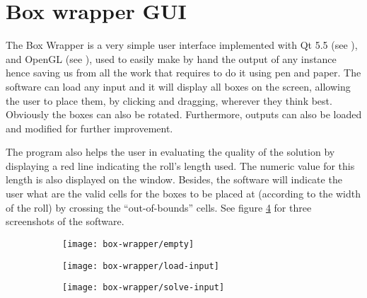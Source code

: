 \section{Box wrapper GUI}
\label{sec:box-wrapper-gui}

The Box Wrapper is a very simple user interface implemented with Qt 5.5
(see \cite{Qt5.5WEB}), and OpenGL (see \cite{OpenGLWEB}), used to easily
make by hand the output of any instance hence saving us from all the work
that requires to do it using pen and paper. The software can load any input
and it will display all boxes on the screen, allowing the user to place
them, by clicking and dragging, wherever they think best. Obviously the
boxes can also be rotated. Furthermore, outputs can also be loaded and
modified for further improvement.

\hfill

The program also helps the user in evaluating the quality of the solution
by displaying a red line indicating the roll's length used. The numeric
value for this length is also displayed on the window. Besides, the software
will indicate the user what are the valid cells for the boxes to be placed
at (according to the width of the roll) by crossing the ``out-of-bounds''
cells. See figure \ref{fig:box-wrapper-screenshots} for three screenshots
of the software.

\begin{figure}[H]
\centering
	\begin{subfigure}{0.3\textwidth}
		\centering
		\texttt{[image: box-wrapper/empty]}
		\label{fig:box-wrapper-screenshots:A}
	\end{subfigure}
	\begin{subfigure}{0.3\textwidth}
		\centering
		\texttt{[image: box-wrapper/load-input]}
		\label{fig:box-wrapper-screenshots:B}
	\end{subfigure}
	\begin{subfigure}{0.3\textwidth}
		\centering
		\texttt{[image: box-wrapper/solve-input]}
		\label{fig:box-wrapper-screenshots:C}
	\end{subfigure}
	\label{fig:box-wrapper-screenshots}
\end{figure}